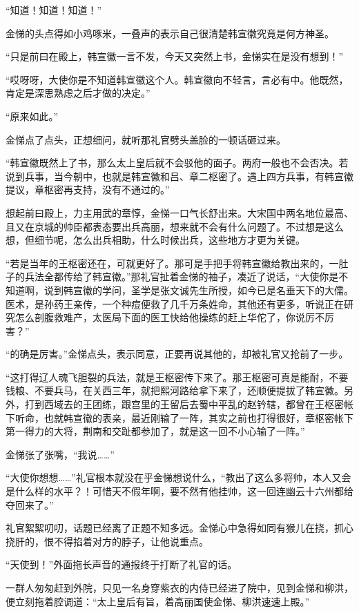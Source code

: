 “知道！知道！知道！”

金悌的头点得如小鸡啄米，一叠声的表示自己很清楚韩宣徽究竟是何方神圣。

“只是前曰在殿上，韩宣徽一言不发，今天又突然上书，金悌实在是没有想到！”

“哎呀呀，大使你是不知道韩宣徽这个人。韩宣徽向不轻言，言必有中。他既然，肯定是深思熟虑之后才做的决定。”

“原来如此。”

金悌点了点头，正想细问，就听那礼官劈头盖脸的一顿话砸过来。

“韩宣徽既然上了书，那么太上皇后就不会驳他的面子。两府一般也不会否决。若说到兵事，当今朝中，也就是韩宣徽和吕、章二枢密了。遇上四方兵事，有韩宣徽提议，章枢密再支持，没有不通过的。”

想起前曰殿上，力主用武的章惇，金悌一口气长舒出来。大宋国中两名地位最高、且又在京城的帅臣都表态要出兵高丽，想来就不会有什么问题了。不过想是这么想，但细节呢，怎么出兵相助，什么时候出兵，这些地方才更为关键。

“若是当年的王枢密还在，可就更好了。那可是手把手将韩宣徽给教出来的，一肚子的兵法全都传给了韩宣徽。”那礼官扯着金悌的袖子，凑近了说话，“大使你是不知道啊，说到韩宣徽的学问，圣学是张文诚先生所授，如今已是名垂天下的大儒。医术，是孙药王亲传，一个种痘便救了几千万条姓命，其他还有更多，听说正在研究怎么剖腹救难产，太医局下面的医工快给他操练的赶上华佗了，你说厉不厉害？”

“的确是厉害。”金悌点头，表示同意，正要再说其他的，却被礼官又抢前了一步。

“这打得辽人魂飞胆裂的兵法，就是王枢密传下来了。那王枢密可真是能耐，不要钱粮、不要兵马，在关西三年，就把熙河路给拿下来了，还顺便提拔了韩宣徽。另外，打到西域去的王团练，跟宫里的王留后去蜀中平乱的赵钤辖，都曾在王枢密帐下听命，也就韩宣徽的表亲，最近刚输了一阵，其实之前也打得很好，章枢密帐下第一得力的大将，荆南和交趾都参加了，就是这一回不小心输了一阵。”

金悌张了张嘴，“我说……”

“大使你想想……”礼官根本就没在乎金悌想说什么，“教出了这么多将帅，本人又会是什么样的水平？！可惜天不假年啊，要不然有他挂帅，这一回连幽云十六州都给夺回来了。”

礼官絮絮叨叨，话题已经离了正题不知多远。金悌心中急得如同有猴儿在挠，抓心挠肝的，恨不得掐着对方的脖子，让他说重点。

“天使到！”外面拖长声音的通报终于打断了礼官的话。

一群人匆匆赶到外院，只见一名身穿紫衣的内侍已经进了院中，见到金悌和柳洪，便立刻拖着腔调道：“太上皇后有旨，着高丽国使金悌、柳洪速速上殿。”

